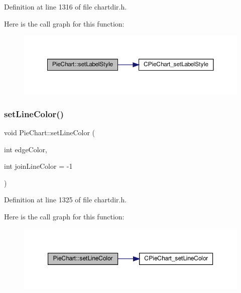 Definition at line 1316 of file chartdir.\+h.

Here is the call graph for this function\+:
\nopagebreak
\begin{figure}[H]
\begin{center}
\leavevmode
\includegraphics[width=350pt]{class_pie_chart_a7881b5842d44d84aed560a1da2b33126_cgraph}
\end{center}
\end{figure}
\mbox{\label{class_pie_chart_a85321c33d5e247ee6bffddadbfa11c43}} 
\subsubsection{\texorpdfstring{set\+Line\+Color()}{setLineColor()}}
{\footnotesize\ttfamily void Pie\+Chart\+::set\+Line\+Color (\begin{DoxyParamCaption}\item[{int}]{edge\+Color,  }\item[{int}]{join\+Line\+Color = {\ttfamily -\/1} }\end{DoxyParamCaption})\hspace{0.3cm}{\ttfamily [inline]}}



Definition at line 1325 of file chartdir.\+h.

Here is the call graph for this function\+:
\nopagebreak
\begin{figure}[H]
\begin{center}
\leavevmode
\includegraphics[width=350pt]{class_pie_chart_a85321c33d5e247ee6bffddadbfa11c43_cgraph}
\end{center}
\end{figure}
\mbox{\label{class_pie_chart_a6e1938c8559b2eee0b3a0f97708105fc}} 
